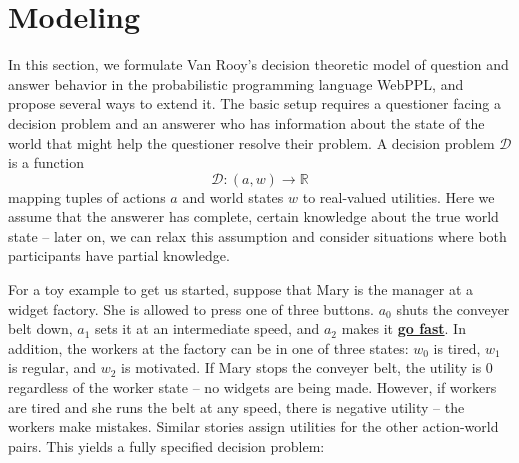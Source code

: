 \documentclass[12pt]{amsart}
\begin{document}



\section{Modeling}

In this section, we formulate Van Rooy's decision theoretic model of question and answer behavior in the probabilistic programming language WebPPL, and propose several ways to extend it. The basic setup requires a questioner facing a decision problem and an answerer who has information about the state of the world that might help the questioner resolve their problem. A decision problem $\mathcal{D}$ is a function $$\mathcal{D} : (a, w) \rightarrow \mathbb{R}$$ mapping tuples of actions $a$ and world states $w$ to real-valued utilities. Here we assume that the answerer has complete, certain knowledge about the true world state -- later on, we can relax this assumption and consider situations where both participants have partial knowledge.

For a toy example to get us started, suppose that Mary is the manager at a widget factory. She is allowed to press one of three buttons. $a_0$ shuts the conveyer belt down, $a_1$ sets it at an intermediate speed, and $a_2$ makes it \textbf{\href{https://www.youtube.com/watch?v=DfGs2Y5WJ14}{go fast}}. In addition, the workers at the factory can be in one of three states: $w_0$ is tired, $w_1$ is regular, and $w_2$ is motivated. If Mary stops the conveyer belt, the utility is 0 regardless of the worker state -- no widgets are being made. However, if workers are tired and she runs the belt at any speed, there is negative utility -- the workers make mistakes. Similar stories assign utilities for the other action-world pairs. This yields a fully specified decision problem:
\end{document}
